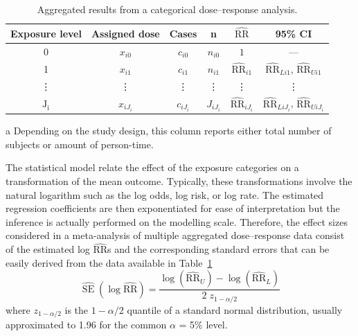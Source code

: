 \documentclass[11pt,a4paper,twoside,openany]{book}\usepackage{knitr}
\DeclareMathOperator{\SE}{SE}
\begin{document}
{\begin{table}
  \centering
  \begin{threeparttable}
    \caption{Aggregated results from a categorical dose--response analysis.}
    \renewcommand{\arraystretch}{1.5}
    \begin{tabular}{cccccc}
      \hline
      Exposure level & Assigned dose & Cases & n\tnote{a} & $\widehat{\mathrm{RR}}$ & 95\% CI \\
      \hline
      0 & $x_{i0}$ & $c_{i0}$ & $n_{i0}$ & $1$ & --- \\
      1 & $x_{i1}$ & $c_{i1}$ & $n_{i1}$ & $\widehat{\mathrm{RR}}_{i1}$ & $\widehat{{\mathrm{RR}}}_{Li1}$, $\widehat{{\mathrm{RR}}}_{Ui1}$ \\
      \vdots & \vdots & \vdots & \vdots & \vdots & \vdots \\
      $\mathrm{J_i}$ & $x_{iJ_i}$ & $c_{iJ_i}$ & $J_{iJ_i}$ & $\widehat{\mathrm{RR}}_{iJ_i}$ & $\widehat{{\mathrm{RR}}}_{LiJ_i}$, $\widehat{{\mathrm{RR}}}_{UiJ_i}$ \\
      \hline
    \end{tabular}
    \begin{tablenotes}
      \item [a] \footnotesize Depending on the study design, this column reports either total number of subjects or amount of person-time.
    \end{tablenotes}
    \label{tab:aggr_data}
\end{threeparttable}
\end{table}

The statistical model relate the effect of the exposure categories on a transformation of the mean outcome. Typically, these transformations involve the natural logarithm such as the log odds, log risk, or log rate. The estimated regression coefficients are then exponentiated for ease of interpretation but the inference is actually performed on the modelling scale. Therefore, the effect sizes considered in a meta-analysis of multiple aggregated dose--response data consist of the estimated log $\widehat{\mathrm{RR}}$s and the corresponding standard errors that can be easily derived from the data available in Table~\ref{tab:aggr_data}
\begin{equation}
\widehat{\SE} \left( \log \widehat{\mathrm{RR}} \right) = \frac{\log \left(\widehat{\mathrm{RR}}_U \right) - \log \left(\widehat{\mathrm{RR}}_L \right)}{2\; z_{1- \alpha/2}}
\label{eq:se_logrr}
\end{equation} 
\noindent where $z_{1- \alpha/2}$ is the $1- \alpha/2$ quantile of a standard normal distribution, usually approximated to 1.96 for the common $\alpha$ = 5\% level.

}
\end{document}
